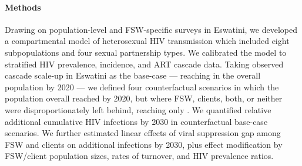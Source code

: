 \paragraph{Methods}
Drawing on population-level and FSW-specific surveys in Eswatini,
we developed a compartmental model of heterosexual HIV transmission
which included eight subpopulations and four sexual partnership types.
We calibrated the model to stratified HIV prevalence, incidence, and ART cascade data.
Taking observed cascade scale-up in Eswatini as the base-case %
--- reaching \cashi in the overall population by 2020 ---
we defined four counterfactual scenarios in which
the population overall reached \casmd by 2020,
but where FSW, clients, both, or neither
were disproportionately left behind, reaching only \caslo.
We quantified relative additional cumulative HIV infections by 2030 %
in counterfactual \vs base-case scenarios.
We further estimated linear effects of
viral suppression gap among FSW and clients on additional infections by 2030, plus
effect modification by FSW/client population sizes, rates of turnover, and HIV prevalence ratios.
